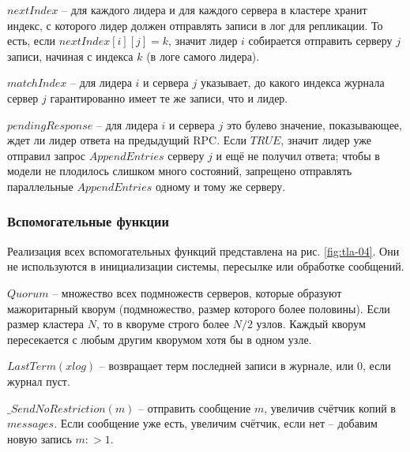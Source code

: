 $nextIndex$ – для каждого лидера и для каждого сервера в кластере хранит индекс,
с которого лидер должен отправлять записи в лог для репликации. То есть,
если $nextIndex[i][j] = k$, значит лидер $i$ собирается отправить серверу $j$ записи,
начиная с индекса $k$ (в логе самого лидера).

$matchIndex$ – для лидера $i$ и сервера $j$ указывает, до какого индекса журнала
сервер $j$ гарантированно имеет те же записи, что и лидер.

$pendingResponse$ – для лидера $i$ и сервера $j$ это булево значение, показывающее,
ждет ли лидер ответа на предыдущий RPC. Если $TRUE$, значит лидер уже отправил запрос
$AppendEntries$ серверу $j$ и ещё не получил ответа; чтобы в модели не плодилось
слишком много состояний, запрещено отправлять параллельные $AppendEntries$ одному
и тому же серверу.

\subsubsection*{Вспомогательные функции}

Реализация всех вспомогательных функций представлена на рис. \ref{fig:tla-04}.
Они не используются в инициализации системы, пересылке или обработке сообщений.

$Quorum$ – множество всех подмножеств серверов, которые образуют мажоритарный
кворум (подмножество, размер которого более половины). Если размер кластера $N$,
то в кворуме строго более $N/2$ узлов. Каждый кворум пересекается с любым другим
кворумом хотя бы в одном узле.

$LastTerm(xlog)$ – возвращает терм последней записи в журнале, или 0, если журнал
пуст.

$\_SendNoRestriction(m)$ – отправить сообщение $m$, увеличив счётчик копий в
$messages$. Если сообщение уже есть, увеличим счётчик, если нет – добавим новую
запись $m :> 1$.

